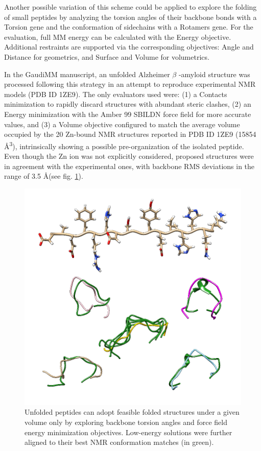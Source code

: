 Another possible variation of this scheme could be applied to explore the folding of small peptides by analyzing the torsion angles of their backbone bonds with a Torsion gene and the conformation of sidechains with a Rotamers gene. For the evaluation, full MM energy can be calculated with the Energy objective. Additional restraints are supported via the corresponding objectives: Angle and Distance for geometrics, and Surface and Volume for volumetrics.

In the GaudiMM manuscript, an unfolded Alzheimer $ \beta $ -amyloid structure was processed following this strategy in an attempt to reproduce experimental NMR models (PDB ID 1ZE9\cite{pdb:1ze9}). The only evaluators used were: (1) a Contacts minimization to rapidly discard structures with abundant steric clashes, (2) an Energy minimization with the Amber 99 SBILDN force field for more accurate values, and (3) a Volume objective configured to match the average volume occupied by the 20 Zn-bound NMR structures reported in PDB ID 1ZE9 (15854 Å\textsuperscript{3}), intrinsically showing a possible pre-organization of the isolated peptide. Even though the Zn ion was not explicitly considered, proposed structures were in agreement with the experimental ones, with backbone RMS deviations in the range of 3.5 \AA (see fig. \ref{fig:peptide-folding}).





\begin{figure}[H] %
	\begin{Center}
		\includegraphics[width=\textwidth]{./figures/06/peptide-folding.png}
	\end{Center}
	\caption[Peptide folding]{Unfolded peptides can adopt feasible folded structures under a given volume only by exploring backbone torsion angles and force field energy minimization objectives. Low-energy solutions were further aligned to their best NMR conformation matches (in green).}
	\label{fig:peptide-folding}
\end{figure}





